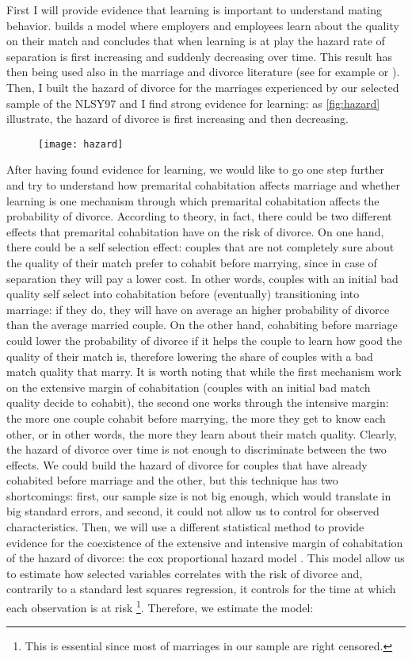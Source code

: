 \documentclass[12pt]{article}
\begin{document}
First I will provide evidence that learning is important to understand mating behavior. \citet{jovanovic1979} builds a model where employers and employees learn about the quality on their match and concludes that when learning is at play the hazard rate of separation is first increasing and suddenly decreasing over time. This result has then being used also in the marriage and divorce literature (see for example \citet{brien2006} or \citet{marinescu2016}).
Then, I built the hazard of divorce for the marriages experienced by our selected sample of the NLSY97 and I find strong evidence for learning: as \autoref{fig:hazard} illustrate, the hazard of divorce is first increasing and then decreasing.
\begin{figure}[H]
	\centering
	\texttt{[image: hazard]}
	\caption{}
	\label{fig:hazard}
\end{figure}
After having found evidence for learning, we would like to go one step further and try to understand how premarital cohabitation affects marriage and whether learning is one mechanism through which premarital cohabitation affects the probability of divorce.
According to theory, in fact, there could be two different effects that premarital cohabitation have on the risk of divorce. On one hand, there could be a self selection effect: couples that are not completely sure about the quality of their match prefer to cohabit before marrying, since in case of separation they will pay a lower cost. In other words, couples with an initial bad quality self select into cohabitation before (eventually) transitioning into marriage: if they do, they will have on average an higher probability of divorce than the average married couple. On the other hand, cohabiting before marriage could lower the probability of divorce if it helps the couple to learn how good the quality of their match is, therefore lowering the share of couples with a bad match quality that marry. It is worth noting that while the first mechanism work on the extensive margin of cohabitation (couples with an initial bad match quality decide to cohabit), the second one works through the intensive margin: the more one couple cohabit before marrying, the more they get to know each other, or in other words, the more they learn about their match quality. Clearly, the hazard of divorce over time is not enough to discriminate between the two effects. We could build the hazard of divorce for couples that have already cohabited before marriage and the other, but this technique has two shortcomings: first, our sample size is not big enough, which would translate in big standard errors, and second, it could not allow us to control for observed characteristics. Then, we will use a different statistical method to provide evidence for the coexistence of the extensive and intensive margin of cohabitation of the hazard of divorce: the cox proportional hazard model \citet{cox1972}. This model allow us to estimate how selected variables correlates with the risk of divorce and, contrarily to a standard lest squares regression, it controls for the time at which each observation is at risk \footnote{This is essential since most of marriages in our sample are right censored.}. Therefore, we estimate the model:
\end{document}
